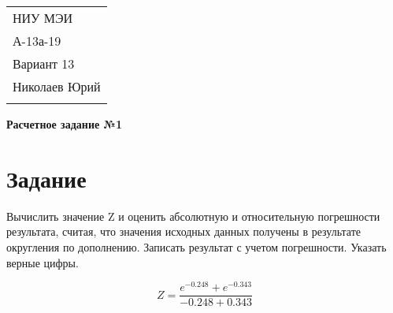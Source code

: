 \documentclass[a4paper,12pt]{article} %
\begin{document}



\thispagestyle{empty} %

\begin{tabular}{p{15.5cm}} %
НИУ МЭИ \\ А-13а-19  \\ Вариант 13 \\ Николаев Юрий\\
\hline %
\\
\end{tabular} %

\vspace*{0.3cm} %

\begin{center} %
	{\Large \bf Расчетное задание №1} %
	\vspace{2mm}
\end{center}  

\vspace{0.4cm}


\section{Задание}
Вычислить значение Z и оценить абсолютную и относительную погрешности результата, считая, что значения исходных данных получены в результате округления по дополнению. Записать результат с учетом погрешности. Указать верные цифры.

\vspace{1cm}

$$Z = \frac{e^{-0.248} + e^{-0.343}}{-0.248 + 0.343}$$
\end{document}
